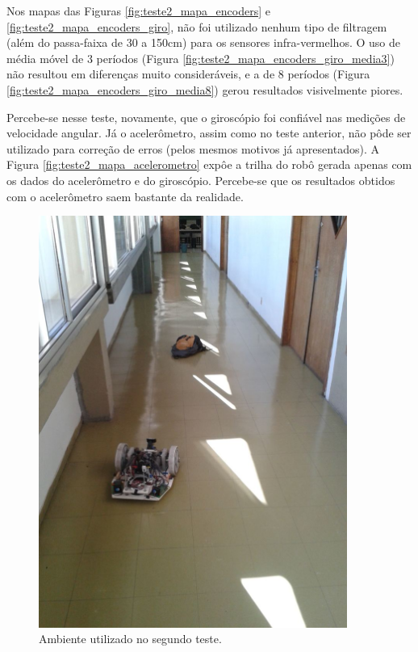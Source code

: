 Nos mapas das Figuras \ref{fig:teste2_mapa_encoders} e \ref{fig:teste2_mapa_encoders_giro}, não foi utilizado nenhum tipo de filtragem (além do passa-faixa de 30 a 150cm) para os sensores infra-vermelhos. O uso de média móvel de 3 períodos (Figura \ref{fig:teste2_mapa_encoders_giro_media3}) não resultou em diferenças muito consideráveis, e a de 8 períodos (Figura \ref{fig:teste2_mapa_encoders_giro_media8}) gerou resultados visivelmente piores.

Percebe-se nesse teste, novamente, que o giroscópio foi confiável nas medições de velocidade angular. Já o acelerômetro, assim como no teste anterior, não pôde ser utilizado para correção de erros (pelos mesmos motivos já apresentados). A Figura \ref{fig:teste2_mapa_acelerometro} expôe a trilha do robô gerada apenas com os dados do acelerômetro e do giroscópio. Percebe-se que os resultados obtidos com o acelerômetro saem bastante da realidade.

\begin{figure}[H]
	\centering
	\includegraphics[width=0.9\textwidth]{./figuras/testes/teste2/foto_ambiente.jpg}
	\caption{Ambiente utilizado no segundo teste.}
	\label{fig:teste2_foto}
\end{figure}

